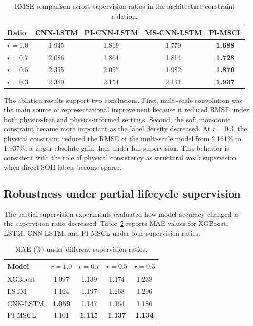 \documentclass[pdflatex,sn-mathphys-num]{sn-jnl}
\begin{document}
\begin{table}[t]
\caption{RMSE comparison across supervision ratios in the architecture-constraint ablation.}
\label{tab:ablation_ratios}
\centering
\begin{tabular}{lcccc}
\toprule
Ratio & CNN-LSTM & PI-CNN-LSTM & MS-CNN-LSTM & PI-MSCL \\
\midrule
$r=1.0$ & 1.945 & 1.819 & 1.779 & \textbf{1.688} \\
$r=0.7$ & 2.086 & 1.864 & 1.814 & \textbf{1.728} \\
$r=0.5$ & 2.355 & 2.057 & 1.982 & \textbf{1.876} \\
$r=0.3$ & 2.380 & 2.154 & 2.161 & \textbf{1.937} \\
\bottomrule
\end{tabular}
\end{table}

The ablation results support two conclusions. First, multi-scale convolution was the main source of representational improvement because it reduced RMSE under both physics-free and physics-informed settings. Second, the soft monotonic constraint became more important as the label density decreased. At $r=0.3$, the physical constraint reduced the RMSE of the multi-scale model from 2.161\% to 1.937\%, a larger absolute gain than under full supervision. This behavior is consistent with the role of physical consistency as structural weak supervision when direct SOH labels become sparse.

\subsection{Robustness under partial lifecycle supervision}
\label{subsec:partial_results}

The partial-supervision experiments evaluated how model accuracy changed as the supervision ratio decreased. Table~\ref{tab:mae_ratios} reports MAE values for XGBoost, LSTM, CNN-LSTM, and PI-MSCL under four supervision ratios.

\begin{table}[t]
\caption{MAE (\%) under different supervision ratios.}
\label{tab:mae_ratios}
\centering
\begin{tabular}{lcccc}
\toprule
Model & $r=1.0$ & $r=0.7$ & $r=0.5$ & $r=0.3$ \\
\midrule
XGBoost & 1.097 & 1.139 & 1.174 & 1.238 \\
LSTM & 1.164 & 1.197 & 1.268 & 1.296 \\
CNN-LSTM & \textbf{1.059} & 1.147 & 1.164 & 1.186 \\
PI-MSCL & 1.101 & \textbf{1.115} & \textbf{1.137} & \textbf{1.134} \\
\bottomrule
\end{tabular}
\end{table}
\end{document}
